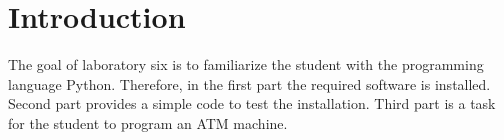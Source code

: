 \section{Introduction}\label{sec: Introduction}
The goal of laboratory six is to familiarize the student with the programming language Python. Therefore, in the first part the required software is installed. Second part provides a simple code to test the installation. Third part is a task for the student to program an ATM machine.